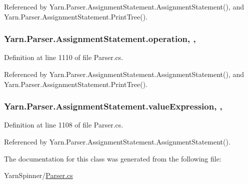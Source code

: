 Referenced by Yarn.\-Parser.\-Assignment\-Statement.\-Assignment\-Statement(), and Yarn.\-Parser.\-Assignment\-Statement.\-Print\-Tree().

\hypertarget{a00029_a896df0f23b44e9f20036150b3527d9e5}{
\subsubsection[{operation}]{ Yarn.\-Parser.\-Assignment\-Statement.\-operation\hspace{0.3cm}{\ttfamily [get]}, {\ttfamily [set]}, {\ttfamily [package]}}}\label{a00029_a896df0f23b44e9f20036150b3527d9e5}


Definition at line 1110 of file Parser.\-cs.



Referenced by Yarn.\-Parser.\-Assignment\-Statement.\-Assignment\-Statement(), and Yarn.\-Parser.\-Assignment\-Statement.\-Print\-Tree().

\hypertarget{a00029_a7ada366012cacd98436db80227ee65f5}{
\subsubsection[{value\-Expression}]{ Yarn.\-Parser.\-Assignment\-Statement.\-value\-Expression\hspace{0.3cm}{\ttfamily [get]}, {\ttfamily [set]}, {\ttfamily [package]}}}\label{a00029_a7ada366012cacd98436db80227ee65f5}


Definition at line 1108 of file Parser.\-cs.



Referenced by Yarn.\-Parser.\-Assignment\-Statement.\-Assignment\-Statement().



The documentation for this class was generated from the following file\-:\begin{DoxyCompactItemize}
\item 
Yarn\-Spinner/\hyperlink{a00295}{Parser.\-cs}\end{DoxyCompactItemize}
